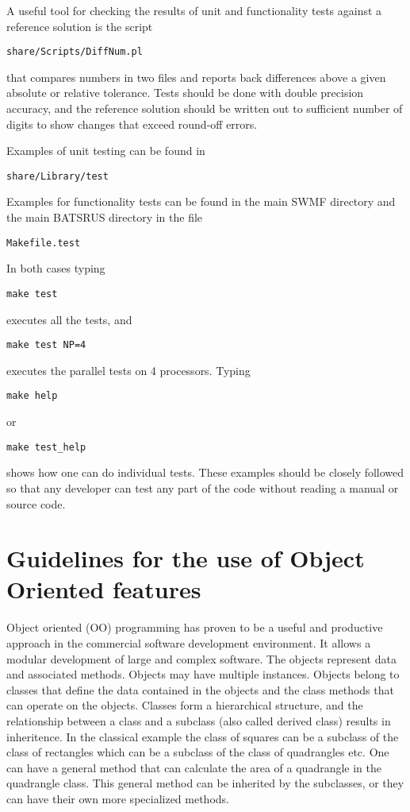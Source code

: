 \documentclass{article}
\begin{document}
A useful tool for checking the results of unit and functionality tests
against a reference solution is the script
\begin{verbatim}
share/Scripts/DiffNum.pl
\end{verbatim}
that compares numbers in two files and reports back differences 
above a given absolute or relative tolerance. Tests should be done with
double precision accuracy, and the reference solution should be written
out to sufficient number of digits to show changes that exceed round-off 
errors.

Examples of unit testing can be found in 
\begin{verbatim}
share/Library/test
\end{verbatim}
Examples for functionality tests can be found in the main SWMF directory
and the main BATSRUS directory in the file
\begin{verbatim}
Makefile.test
\end{verbatim}
In both cases typing
\begin{verbatim}
make test
\end{verbatim}
executes all the tests, and
\begin{verbatim}
make test NP=4
\end{verbatim}
executes the parallel tests on 4 processors. Typing
\begin{verbatim}
make help
\end{verbatim}
or
\begin{verbatim}
make test_help
\end{verbatim}
shows how one can do individual tests. 
These examples should be closely followed so that any developer can test
any part of the code without reading a manual or source code.

\section{Guidelines for the use of Object Oriented features 
         \label{sec:object}}

Object oriented (OO) programming has proven to be a useful and productive 
approach in the commercial software development environment. It allows
a modular development of large and complex software. The objects 
represent data and associated methods. Objects may have multiple instances.
Objects belong to classes that define the data contained in the objects 
and the class methods that can operate on the objects. 
Classes form a hierarchical structure,
and the relationship between a class and a subclass (also called derived
class) results in inheritence.
In the classical example the class of squares can be a subclass of the
class of rectangles which can be a subclass of the class of quadrangles etc.
One can have a general method that can calculate the area of a 
quadrangle in the quadrangle class. This general method can be inherited
by the subclasses, or they can have their own more specialized methods.
\end{document}
